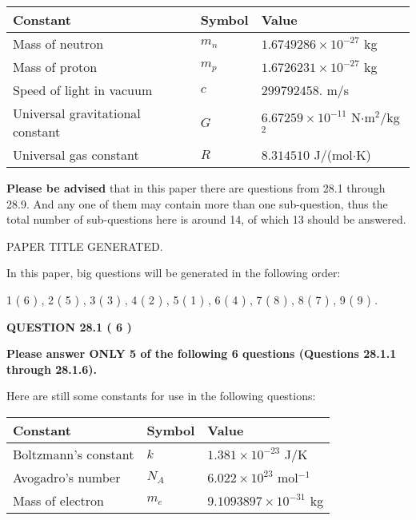 \documentclass[12pt]{article}
\begin{document}
 
\noindent\begin{tabular}{|l|l|l|}
\hline
Constant & Symbol & Value \\
\hline
Mass of neutron &
$m_n$ &
 $ 1.6749286 \times 10^{-27} $
kg \\
\hline
Mass of proton &
$m_p$ &
 $ 1.6726231 \times 10^{-27} $
kg \\
\hline
Speed of light in vacuum &
$c$ &
 $ 299792458. $
m/s \\
\hline
Universal gravitational constant &
$G$ &
 $ 6.67259 \times 10^{-11} $
N$\cdot $m$^2$/kg$^2$ \\
\hline
Universal gas constant &
$R$ &
 $ 8.314510 $
J/(mol$\cdot $K) \\
\hline
\end{tabular}
 
 
{\textbf{\large{Please be advised}}} that in this paper there are questions from
28.1 through
28.9.
And any one of them may contain more than one sub-question, thus the total number
of sub-questions here is around 14, of which
13 should be answered.
 
\vspace{0.3in}
 
 
   
   
 PAPER TITLE GENERATED.
   
   
   
\vspace{0.2in}
   
In this paper, big questions will be generated in the following order: 
   
   
             1 (           6 )
 ,
             2 (           5 )
 ,
             3 (           3 )
 ,
             4 (           2 )
 ,
             5 (           1 )
 ,
             6 (           4 )
 ,
             7 (           8 )
 ,
             8 (           7 )
 ,
             9 (           9 )
 .
  
\vspace{0.2in}
  
{\textbf{\Large{QUESTION
28.1 
 (           6 )
}}}
  
  
 
{\textbf{\Large{Please answer ONLY
5 of the following
6 questions (Questions
28.1.1 through
28.1.6). }}}
 
Here are still some constants for use in the following questions:
 
 
\noindent\begin{tabular}{|l|l|l|}
\hline
Constant & Symbol & Value \\
\hline
 
Boltzmann's constant &
$k$ &
 $ 1.381 \times 10^{-23} $
J/K \\
\hline
 
Avogadro's number &
$N_A$ &
 $ 6.022 \times 10^{23} $
mol$^{-1}$ \\
\hline
 
Mass of electron &
$m_e$ &
 $ 9.1093897 \times 10^{-31} $
kg \\
\hline
 
\end{tabular}
 
\end{document}
